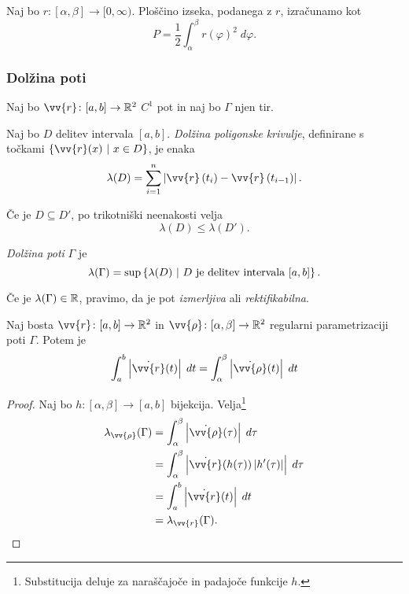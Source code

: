 \documentclass[12pt, a4paper]{article}
\begin{document}
\begin{trditev}
Naj bo $r\colon[\alpha,\beta]\to[0,\infty)$. Ploščino izseka, podanega z $r$, izračunamo kot
\[
P=\frac{1}{2}\int_\alpha^\beta r(\varphi)^2\;d\varphi.
\]
\end{trditev}

\subsubsection{Dolžina poti}

Naj bo $\vv{r}\colon[a,b]\to\R^2$ $C^1$ pot in naj bo $\Gamma$ njen tir.

\begin{definicija}
Naj bo $D$ delitev intervala $[a,b]$. \emph{Dolžina poligonske krivulje}, definirane s točkami $\setb{\vv{r}(x)}{x\in D}$, je enaka
\[
\lambda(D)=\sum_{i=1}^n\abs{\vv{r}\left(t_i\right)-\vv{r}\left(t_{i-1}\right)}.
\]
\end{definicija}

\begin{opomba}
Če je $D\subseteq D'$, po trikotniški neenakosti velja
\[
\lambda(D)\leq\lambda(D').
\]
\end{opomba}

\begin{definicija}
\emph{Dolžina poti} $\Gamma$ je
\[
\lambda(\Gamma)=\sup\left\{\lambda(D)~\middle\vert~\text{$D$ je delitev intervala $[a,b]$}\right\}.
\]
\end{definicija}

\begin{opomba}
Če je $\lambda(\Gamma)\in\mathbb{R}$, pravimo, da je pot \emph{izmerljiva} ali \emph{rektifikabilna}.
\end{opomba}

\begin{izrek}
Naj bosta $\vv{r}\colon[a,b]\to\R^2$ in $\vv{\rho}\colon[\alpha,\beta]\to\R^2$ regularni parametrizaciji poti $\Gamma$. Potem je
\[
\int_a^b \abs{\dot{\vv{r}}(t)}\;dt=\int_\alpha^\beta \abs{\dot{\vv{\rho}}(t)}\;dt
\]
\end{izrek}

\begin{proof}
Naj bo $h\colon[\alpha,\beta]\to[a,b]$ bijekcija. Velja\footnote{Substitucija deluje za naraščajoče in padajoče funkcije $h$.}
\begin{align*}
\lambda_{\vv{\rho}}(\Gamma)&=\int_\alpha^\beta \abs{\dot{\vv{\rho}}(\tau)}\;d\tau
\\
&=\int_\alpha^\beta \abs{\Dot{\vv{r}}(h(\tau))\abs{h'(\tau)}}\;d\tau
\\
&=\int_a^b\abs{\dot{\vv{r}}(t)}\;dt
\\
&=\lambda_{\vv{r}}(\Gamma).\qedhere
\end{align*}
\end{proof}
\end{document}
